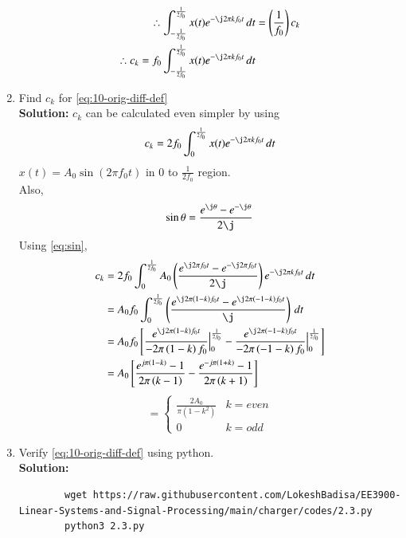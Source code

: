 \documentclass[journal,12pt,twocolumn]{IEEEtran}
\newcommand{\solution}{\noindent \textbf{Solution: }}
\providecommand{\brak}[1]{\ensuremath{\left(#1\right)}}
\providecommand{\sbrak}[1]{\ensuremath{\left[#1\right]}}
\numberwithin{equation}{section}
\renewcommand\thesection{\arabic{section}}
\begin{document}
\begin{enumerate}[label=\thesection.\arabic*,ref=\thesection.\theenumi]
\begin{align}
   \therefore \int_{-\frac{1}{2f_0}}^{\frac{1}{2f_0}}x(t)e^{-\j2\pi kf_0 t}\, dt &=\brak{\frac{1}{f_0}}c_k\\
  \therefore c_k = f_0\int_{-\frac{1}{2f_0}}^{\frac{1}{2f_0}}x(t)e^{-\j2\pi kf_0 t}\, dt
    \end{align}
        \item Find $c_k$ for 
        \eqref{eq:10-orig-diff-def}\\
        \solution
        $c_k$ can be calculated even simpler by using
        \begin{align}
        c_k = 2f_0\int_{0}^{\frac{1}{2f_0}}x(t)e^{- \j2 \pi kf_0 t}\, dt
        \end{align}
        $x(t)=A_0 \sin\brak{2 \pi f_0t}$ in 0 to $\frac{1}{2f_0}$ region.\\
Also,
        \begin{align}
        \label{eq:sin}
     \sin \theta  =\frac{e^{\j\theta}-e^{-\j \theta}}{2\j} 
      \end{align}
      Using \eqref{eq:sin},
      \begin{align}
      c_k &= 2f_0\int_{0}^{\frac{1}{2f_0}}A_0 \brak{\frac{e^{\j2\pi f_0t}-e^{-\j 2\pi f_0t}}{2\j}} e^{- \j2 \pi kf_0 t}\,dt\\
      &=A_0f_0\int_{0}^{\frac{1}{2f_0}} \brak{\frac{e^{\j2\pi\brak{1-k} f_0t}-e^{\j 2\pi\brak{-1-k} f_0t}}{\j}}\,dt\\
&=A_0f_0\sbrak{\frac{e^{\j2\pi\brak{1-k} f_0t}}{-2\pi \brak{1-k}f_0}\Big|_0^{\frac{1}{2f_0}} - \frac{e^{\j2\pi\brak{-1-k} f_0t}}{-2\pi \brak{-1-k}f_0}\Big|_0^{\frac{1}{2f_0}}}\\
&=A_0\sbrak{\frac{e^{j\pi\brak{1-k}}-1}{2\pi\brak{k-1}}-\frac{e^{-j\pi\brak{1+k}}-1}{2\pi\brak{k+1}}}
      \end{align}
      \begin{equation}
      \label{eq:ck}
     = \begin{cases}
\frac{2A_0}{\pi\brak{1-k^2}}&k=even
\\
0&k=odd
\end{cases}
      \end{equation}
    \item Verify 
        \eqref{eq:10-orig-diff-def}
        using python.\\
        \solution 
        \begin{lstlisting}
        wget https://raw.githubusercontent.com/LokeshBadisa/EE3900-Linear-Systems-and-Signal-Processing/main/charger/codes/2.3.py
        python3 2.3.py
        \end{lstlisting}

\end{enumerate}
\end{document}
